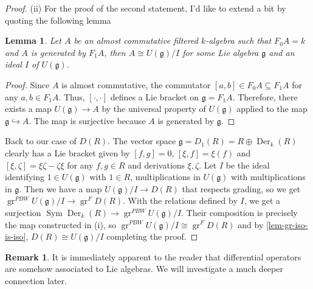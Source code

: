 \documentclass[11pt, a4paper]{article}
\newtheorem{lemma}[theorem]{Lemma}
\theoremstyle{definition}
\newtheorem{remark}[theorem]{Remark}
\newcommand{\gr}{\operatorname{gr}}
\newcommand{\Sym}[0]{\operatorname{Sym}}
\newcommand{\g}{\mathfrak g}
\newcommand{\Der}{\operatorname{Der}}
\begin{document}
\begin{proof}
        (ii) For the proof of the second statement, I'd like to extend a bit by quoting the following lemma
        \begin{lemma}
            Let $A$ be an almost commutative filtered $k$-algebra such that $F_0A=k$ and $A$ is generated by $F_1A$, then $A\cong U(\g)/I$ for some Lie algebra $\g$ and an ideal $I$ of $U(\g)$.
        \end{lemma}
        \begin{proof}
            Since $A$ is almost commutative, the commutator $[a, b]\in F_0A\subseteq F_1A$ for any $a, b\in F_1A$. Thus, $[\cdot, \cdot]$ defines a Lie bracket on $\g=F_1A$. Therefore, there exists a map $U(\g)\to A$ by the universal property of $U(\g)$ applied to the map $\g\hookrightarrow A$. The map is surjective because $A$ is generated by $\g$.
        \end{proof}
        Back to our case of $D(R)$. The vector space $\g=D_1(R)=R\oplus\Der_k(R)$ clearly has a Lie bracket given by $[f,g]=0$, $[\xi, f]=\xi(f)$ and $[\xi,\zeta]=\xi\zeta-\zeta\xi$ for any $f, g\in R$ and derivations $\xi, \zeta$. Let $I$ be the ideal identifying $1\in U(\g)$ with $1\in R$, multiplications in $U(\g)$ with multiplications in $\g$. Then we have a map $U(\g)/I\to D(R)$ that respects grading, so we get $\gr^{\mathit{PBW}} U(\g)/I\to\gr^F D(R)$. With the relations defined by $I$, we get a surjection $\Sym\Der_k(R)\to\gr^{\mathit{PBW}} U(\g)/I$. Their composition is precisely the map constructed in (i), so $\gr^{\mathit{PBW}} U(\g)/I\cong\gr^F D(R)$ and by \cref{lem-gr-iso-is-iso}, $D(R)\cong U(\g)/I$ completing the proof.
    \end{proof}
    \begin{remark}
        It is immediately apparent to the reader that differential operators are somehow associated to Lie algebras. We will investigate a much deeper connection later.
    \end{remark}
\end{document}
